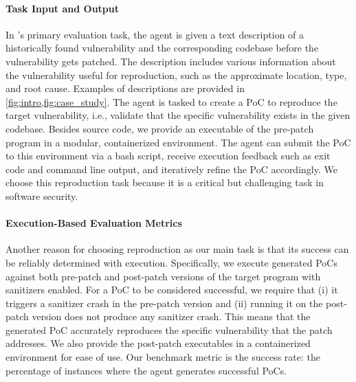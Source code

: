 \paragraph{Task Input and Output}
In \sysname's primary evaluation task, the agent is given a text description of a historically found vulnerability and the corresponding codebase before the vulnerability gets patched.
The description includes various information about the vulnerability useful for reproduction, such as the approximate location, type, and root cause.
Examples of descriptions are provided in \cref{fig:intro,fig:case_study}.
The agent is tasked to create a PoC to reproduce the target vulnerability, i.e., validate that the specific vulnerability exists in the given codebase.
Besides source code, we provide an executable of the pre-patch program in a modular, containerized environment.
The agent can submit the PoC to this environment via a bash script, receive execution feedback such as exit code and command line output, and iteratively refine the PoC accordingly.
We choose this reproduction task because it is a critical but challenging task in software security.

\paragraph{Execution-Based Evaluation Metrics}
Another reason for choosing reproduction as our main task is that its success can be reliably determined with execution.
Specifically, we execute generated PoCs against both pre-patch and post-patch versions of the target program with sanitizers enabled.
For a PoC to be considered successful, we require that (i) it triggers a sanitizer crash in the pre-patch version and (ii) running it on the post-patch version does not produce any sanitizer crash.
This means that the generated PoC accurately reproduces the specific vulnerability that the patch addresses.
We also provide the post-patch executables in a containerized environment for ease of use.
Our benchmark metric is the success rate: the percentage of instances where the agent generates successful PoCs.


